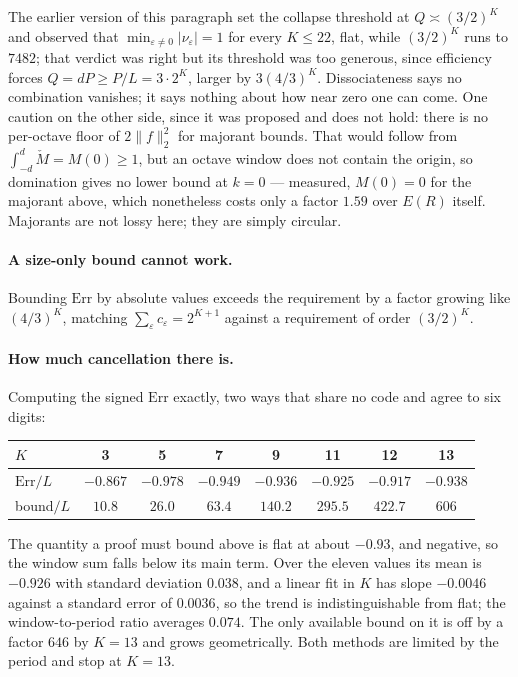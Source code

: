 \documentclass[11pt]{article}
\theoremstyle{remark}
\newcommand{\eps}{\varepsilon}
\begin{document}
The earlier version of this paragraph set the collapse threshold at $Q\asymp(3/2)^K$ and observed that
$\min_{\eps\ne0}|\nu_\eps|=1$ for every $K\le22$, flat, while $(3/2)^K$ runs to $7482$; that verdict was
right but its threshold was too generous, since efficiency forces $Q=dP\ge P/L=3\cdot2^K$, larger by
$3(4/3)^K$. Dissociateness says no combination vanishes; it says nothing about how near zero one can
come. One caution on the other side, since it was proposed and does not hold: there is no per-octave
floor of $2\|f\|_2^2$ for majorant bounds. That would follow from $\int_{-d}^d\check M=M(0)\ge1$, but an
octave window does not contain the origin, so domination gives no lower bound at $k=0$ --- measured,
$M(0)=0$ for the majorant above, which nonetheless costs only a factor $1.59$ over $E(R)$ itself.
Majorants are not lossy here; they are simply circular.

\paragraph{A size-only bound cannot work.} Bounding $\mathrm{Err}$ by absolute values exceeds the
requirement by a factor growing like $(4/3)^K$, matching $\sum_\eps c_\eps=2^{K+1}$ against a requirement
of order $(3/2)^K$.

\paragraph{How much cancellation there is.} Computing the signed $\mathrm{Err}$ exactly, two ways that
share no code and agree to six digits:

\begin{center}
\begin{tabular}{lccccccc}
\toprule
$K$ & 3 & 5 & 7 & 9 & 11 & 12 & 13\\
\midrule
$\mathrm{Err}/L$ & $-0.867$ & $-0.978$ & $-0.949$ & $-0.936$ & $-0.925$ & $-0.917$ & $-0.938$\\
bound$/L$ & $10.8$ & $26.0$ & $63.4$ & $140.2$ & $295.5$ & $422.7$ & $606$\\
\bottomrule
\end{tabular}
\end{center}

The quantity a proof must bound above is flat at about $-0.93$, and negative, so the window sum falls
below its main term. Over the eleven values its mean is $-0.926$ with standard deviation $0.038$, and a linear
fit in $K$ has slope $-0.0046$ against a standard error of $0.0036$, so the trend is indistinguishable from flat;
the window-to-period ratio averages $0.074$. The only available bound on it is off by a factor $646$ by $K=13$ and grows
geometrically. Both methods are limited by the period and stop at $K=13$.
\end{document}
